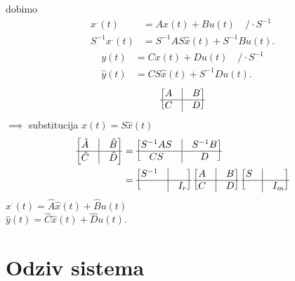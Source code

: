 \documentclass[a4paper, 12pt]{book}
\theoremstyle{definition}
\theoremstyle{remark}
\begin{document}
dobimo
\begin{align*}
    x^{.}(t) &= Ax(t) + Bu(t) \quad / \cdot S^{-1} \\
    S^{-1} x^{.}(t) &= S^{-1} A S \hat{x}(t) + S^{-1} Bu(t).
\end{align*}
\begin{align*}
    y(t) &= Cx(t) + Du(t) \quad / \cdot S^{-1} \\
    \hat{y}(t) &= C S \hat{x}(t) + S^{-1} Du(t).
\end{align*}
\begin{align*}
    \begin{bmatrix}
        A & \vline & B \\
        \hline
        C & \vline & D
    \end{bmatrix}
\end{align*}
$\implies$ substitucija $x(t) = S \hat{x}(t)$
\begin{align*}
    \begin{bmatrix}
        \hat{A} & \vline & \hat{B} \\
        \hline
        \hat{C} & \vline & \hat{D}
    \end{bmatrix}
    &=
    \begin{bmatrix}
        S^{-1} A S & \vline & S^{-1} B \\
        \hline
        CS & \vline & D
    \end{bmatrix} \\
    &= \begin{bmatrix}
        S^{-1} & \vline & \\
        \hline
         & \vline & I_r
    \end{bmatrix}
    \begin{bmatrix}
        A & \vline & B \\
        \hline
        C & \vline & D
    \end{bmatrix}
    \begin{bmatrix}
        S & \vline & \\
        \hline
         & \vline & I_m
    \end{bmatrix}
\end{align*}
$\hat{x}^{.}(t) = \hat{A} \hat{x}(t) + \hat{B} u(t)$ \\
$\hat{y}(t) = \hat{C} \hat{x}(t) + \hat{D} u(t)$.


\section{Odziv sistema}
\end{document}
